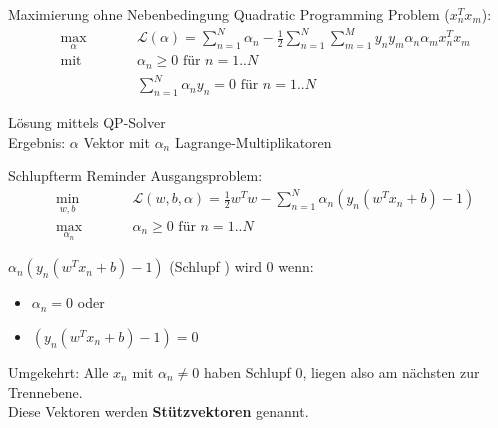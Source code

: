 \documentclass[ngerman]{beamer}
\newcommand{\Lagr}{\mathcal{L}}
\begin{document}
\begin{frame}{Maximierung ohne Nebenbedingung}
	Quadratic Programming Problem ($x_{n}^{T} x_{m}$):
	\begin{subequations}
		\begin{alignat*}{2}
			&\!\max_{\alpha}        &\qquad&  	\Lagr(\alpha) = \sum_{n=1}^{N} \alpha_{n} - \frac{1}{2} \sum_{n=1}^{N} \sum_{m=1}^{M} y_{n} y_{m} \alpha_{n} \alpha_{m} x_{n}^{T} x_{m}\\
			&\text{mit } &      & \alpha_{n} \geq 0 \text{ für } n=1..N \\
			&       & & \sum_{n=1}^{N} \alpha_{n} y_{n} = 0\text{ für } n=1..N
		\end{alignat*}
	\end{subequations}

	Lösung mittels QP-Solver \\
	Ergebnis: $\alpha$ Vektor mit $\alpha_{n}$ Lagrange-Multiplikatoren

\end{frame}


\begin{frame}{Schlupfterm}
	Reminder Ausgangsproblem:
	\begin{subequations}
		\begin{alignat*}{2}
			&\!\min_{w, b}        &\qquad&  \Lagr (w, b, \alpha) = \frac{1}{2} w^{T} w - \sum_{n=1}^{N} \alpha_{n} (y_n (w^{T} x_{n} + b)-1)\\
			&\max_{\alpha_{n}} &      & \alpha_{n} \geq 0 \text{ für } n=1..N
		\end{alignat*}
	\end{subequations}
	
	
	 $\alpha_{n} (y_n (w^{T} x_{n} + b)-1)$ (\glqq Schlupf \grqq) wird $0$ wenn:
	 \begin{itemize}
	 	\item $\alpha_{n} = 0$ oder 
	 	\item $(y_n (w^{T} x_{n} + b)-1) = 0$
	 \end{itemize}
	 
	 Umgekehrt: Alle $x_{n}$ mit $\alpha_{n} \neq 0$ haben Schlupf $0$, liegen also am nächsten zur Trennebene. \\
	 
	 Diese Vektoren werden \textbf{Stützvektoren} genannt.
\end{frame}
\end{document}
